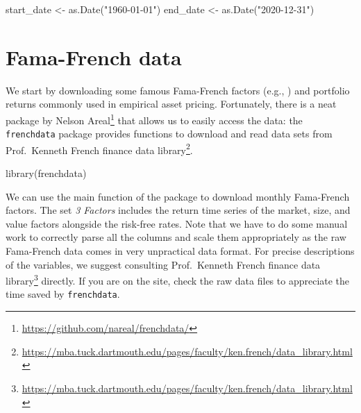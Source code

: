 \documentclass[
]{krantz}
\newenvironment{Shaded}{\begin{snugshade}}{\end{snugshade}}
\newcommand{\FunctionTok}[1]{\textcolor[rgb]{0,0,0}{#1}}
\newcommand{\NormalTok}[1]{#1}
\newcommand{\OtherTok}[1]{\textcolor[rgb]{0.37,0.37,0.37}{#1}}
\newcommand{\StringTok}[1]{\textcolor[rgb]{0.5,0.5,0.5}{#1}}
\renewcommand{\href}[2]{#2\footnote{\url{#1}}}
\begin{document}
\begin{Shaded}
\begin{Highlighting}[]
\NormalTok{start\_date }\OtherTok{\textless{}{-}} \FunctionTok{as.Date}\NormalTok{(}\StringTok{"1960{-}01{-}01"}\NormalTok{)}
\NormalTok{end\_date }\OtherTok{\textless{}{-}} \FunctionTok{as.Date}\NormalTok{(}\StringTok{"2020{-}12{-}31"}\NormalTok{)}
\end{Highlighting}
\end{Shaded}

\hypertarget{fama-french-data}{%
\section{Fama-French data}\label{fama-french-data}}

We start by downloading some famous Fama-French factors (e.g., \citep{Fama1993}) and portfolio returns commonly used in empirical asset pricing. Fortunately, there is a neat package by \href{https://github.com/nareal/frenchdata/}{Nelson Areal} that allows us to easily access the data: the \texttt{frenchdata} package provides functions to download and read data sets from \href{https://mba.tuck.dartmouth.edu/pages/faculty/ken.french/data_library.html}{Prof.~Kenneth French finance data library}.

\begin{Shaded}
\begin{Highlighting}[]
\FunctionTok{library}\NormalTok{(frenchdata)}
\end{Highlighting}
\end{Shaded}

We can use the main function of the package to download monthly Fama-French factors. The set \emph{3 Factors} includes the return time series of the market, size, and value factors alongside the risk-free rates. Note that we have to do some manual work to correctly parse all the columns and scale them appropriately as the raw Fama-French data comes in very unpractical data format. For precise descriptions of the variables, we suggest consulting \href{https://mba.tuck.dartmouth.edu/pages/faculty/ken.french/data_library.html}{Prof.~Kenneth French finance data library} directly. If you are on the site, check the raw data files to appreciate the time saved by \texttt{frenchdata}.
\end{document}
